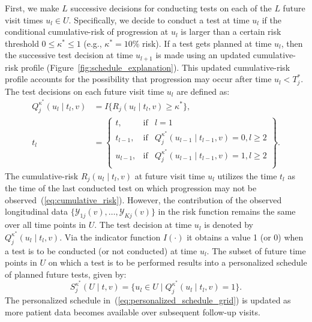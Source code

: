 First, we make $L$ successive decisions for conducting tests on each of the $L$ future visit times $u_l \in U$. Specifically, we decide to conduct a test at time $u_l$ if the conditional cumulative-risk of progression at $u_l$ is larger than a certain risk threshold $0 \leq \kappa^* \leq 1$ (e.g., $\kappa^*=10$\% risk). If a test gets planned at time $u_l$, then the successive test decision at time $u_{l+1}$ is made using an updated cumulative-risk profile (Figure~\ref{fig:schedule_explanation}). This updated cumulative-risk profile accounts for the possibility that progression may occur after time $u_l < T^*_j$. The test decisions on each future visit time $u_l$ are defined as:
\begin{equation*}
\label{eq:personalized_decision_grid}
\begin{split}
Q_j^{\kappa^*}(u_l \mid t_l, v) &= I\big\{R_j(u_l \mid t_l, v) \geq \kappa^* \big\},\\
t_l &= \left\{\begin{array}{lcr}
  t, &\mbox{if}& l=1\\
  t_{l-1}, &\mbox{if}&  Q_j^{\kappa^*}(u_{l-1} \mid t_{l-1}, v)=0, l\geq 2\\ 
  u_{l-1}, &\mbox{if}&  Q_j^{\kappa^*}(u_{l-1} \mid t_{l-1}, v)=1, l\geq 2\\
\end{array} \right\}.
\end{split}
\end{equation*}
The cumulative-risk $R_j(u_l \mid t_l, v)$ at future visit time $u_l$ utilizes the time $t_l$ as the time of the last conducted test on which progression may not be observed~(\ref{eq:cumulative_risk}). However, the contribution of the observed longitudinal data $\{\mathcal{Y}_{1j}(v), \ldots, \mathcal{Y}_{Kj}(v)\}$ in the risk function remains the same over all time points in $U$. The test decision at time $u_l$ is denoted by ${Q_j^{\kappa^*}(u_l \mid t_l, v)}$. Via the indicator function $I(\cdot)$ it obtains a value 1 (or 0) when a test is to be conducted (or not conducted) at time $u_l$. The subset of future time points in $U$ on which a test is to be performed results into a personalized schedule of planned future tests, given by:
\begin{equation}
\label{eq:personalized_schedule_grid}
S_j^{\kappa^*}(U \mid t, v) = \big\{ u_l \in U \mid Q_j^{\kappa^*}(u_l \mid t_l, v)=1\big\}.
\end{equation}
The personalized schedule in~(\ref{eq:personalized_schedule_grid}) is updated as more patient data becomes available over subsequent follow-up visits.

